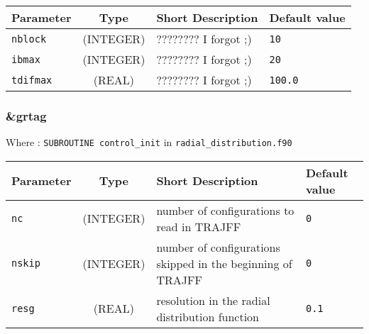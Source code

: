 \documentclass[a4paper]{article}
\begin{document}
\begin{longtable}{l|c|m{8cm}|m{2cm}}
\hline
\hline
Parameter        &  Type              &          Short Description                                                          & Default value \\
\hline
\hline
\rule[-0.75cm]{0cm}{1.5cm}
\verb?nblock?    & (INTEGER)          & ???????? I forgot ;)                                                                & \verb?10? \\
\hline
\rule[-0.75cm]{0cm}{1.5cm}
\verb?ibmax?     &  (INTEGER)         & ???????? I forgot ;)                                                                & \verb?20? \\
\hline
\rule[-0.75cm]{0cm}{1.5cm}
\verb?tdifmax?   & (REAL)             & ???????? I forgot ;)                                                                & \verb?100.0? \\
\hline
\hline
\end{longtable}


\subsubsection{\&grtag}

Where : \verb?SUBROUTINE control_init? in \verb?radial_distribution.f90?
\newline

\begin{longtable}{l|c|m{8cm}|m{2cm}}
\hline
\hline
Parameter        &  Type              &          Short Description                                                          & Default value \\
\hline
\hline
\rule[-0.75cm]{0cm}{1.5cm}
\verb?nc?        & (INTEGER)          & number of configurations to read in TRAJFF                                          & \verb?0? \\
\rule[-0.75cm]{0cm}{1.5cm}
\verb?nskip?     & (INTEGER)          & number of configurations skipped in the beginning of TRAJFF                         & \verb?0? \\
\rule[-0.75cm]{0cm}{1.5cm}
\verb?resg?      & (REAL)             & resolution in the radial distribution function                                      & \verb?0.1? \\
\hline
\hline
\end{longtable}
\end{document}
